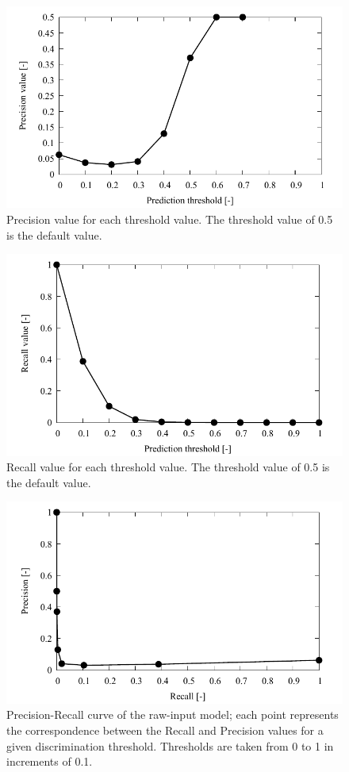\begin{figure}[H]
    \centering
    \includegraphics[width=0.8\linewidth]{./Figure/4_Results/training/precision_threshold.pdf}
    \caption{Precision value for each threshold value. The threshold value of \num{0.5} is the default value.}
    \label{fig:stripePatternVector}
\end{figure}

\begin{figure}[H]
    \centering
    \includegraphics[width=0.8\linewidth]{./Figure/4_Results/training/recall_threshold.pdf}
    \caption{Recall value for each threshold value. The threshold value of \num{0.5} is the default value.}
    \label{fig:stripePatternVector}
\end{figure}

\begin{figure}[H]
    \centering
    \includegraphics[width=0.8\linewidth]{./Figure/4_Results/training/prcurve.pdf}
    \caption{Precision-Recall curve of the raw-input model; each point represents the correspondence between the Recall and Precision values for a given discrimination threshold. Thresholds are taken from 0 to 1 in increments of 0.1.}
    \label{fig:stripePatternVector}
\end{figure}

